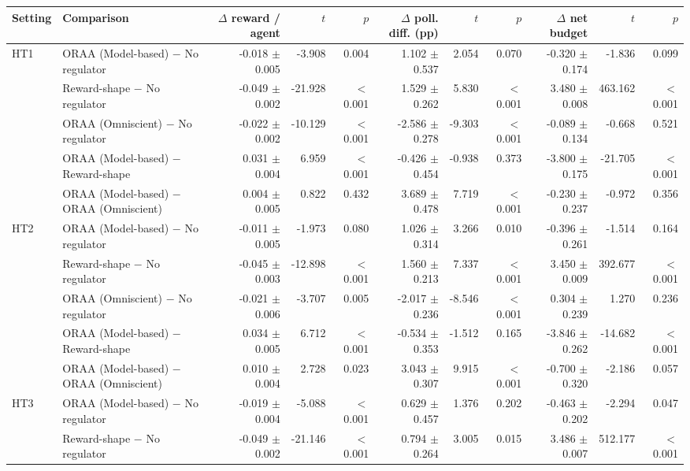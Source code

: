 \begin{tabular}{llrrrrrrrrr}
\toprule
Setting & Comparison & $\Delta$ reward / agent & $t$ & $p$ & $\Delta$ poll. diff. (pp) & $t$ & $p$ & $\Delta$ net budget & $t$ & $p$ \\
\midrule
HT1 & ORAA (Model-based) $-$ No regulator & -0.018 $\pm$ 0.005 & -3.908 & 0.004 & 1.102 $\pm$ 0.537 & 2.054 & 0.070 & -0.320 $\pm$ 0.174 & -1.836 & 0.099 \\
 & Reward-shape $-$ No regulator & -0.049 $\pm$ 0.002 & -21.928 & $<$0.001 & 1.529 $\pm$ 0.262 & 5.830 & $<$0.001 & 3.480 $\pm$ 0.008 & 463.162 & $<$0.001 \\
 & ORAA (Omniscient) $-$ No regulator & -0.022 $\pm$ 0.002 & -10.129 & $<$0.001 & -2.586 $\pm$ 0.278 & -9.303 & $<$0.001 & -0.089 $\pm$ 0.134 & -0.668 & 0.521 \\
 & ORAA (Model-based) $-$ Reward-shape & 0.031 $\pm$ 0.004 & 6.959 & $<$0.001 & -0.426 $\pm$ 0.454 & -0.938 & 0.373 & -3.800 $\pm$ 0.175 & -21.705 & $<$0.001 \\
 & ORAA (Model-based) $-$ ORAA (Omniscient) & 0.004 $\pm$ 0.005 & 0.822 & 0.432 & 3.689 $\pm$ 0.478 & 7.719 & $<$0.001 & -0.230 $\pm$ 0.237 & -0.972 & 0.356 \\
\addlinespace
HT2 & ORAA (Model-based) $-$ No regulator & -0.011 $\pm$ 0.005 & -1.973 & 0.080 & 1.026 $\pm$ 0.314 & 3.266 & 0.010 & -0.396 $\pm$ 0.261 & -1.514 & 0.164 \\
 & Reward-shape $-$ No regulator & -0.045 $\pm$ 0.003 & -12.898 & $<$0.001 & 1.560 $\pm$ 0.213 & 7.337 & $<$0.001 & 3.450 $\pm$ 0.009 & 392.677 & $<$0.001 \\
 & ORAA (Omniscient) $-$ No regulator & -0.021 $\pm$ 0.006 & -3.707 & 0.005 & -2.017 $\pm$ 0.236 & -8.546 & $<$0.001 & 0.304 $\pm$ 0.239 & 1.270 & 0.236 \\
 & ORAA (Model-based) $-$ Reward-shape & 0.034 $\pm$ 0.005 & 6.712 & $<$0.001 & -0.534 $\pm$ 0.353 & -1.512 & 0.165 & -3.846 $\pm$ 0.262 & -14.682 & $<$0.001 \\
 & ORAA (Model-based) $-$ ORAA (Omniscient) & 0.010 $\pm$ 0.004 & 2.728 & 0.023 & 3.043 $\pm$ 0.307 & 9.915 & $<$0.001 & -0.700 $\pm$ 0.320 & -2.186 & 0.057 \\
\addlinespace
HT3 & ORAA (Model-based) $-$ No regulator & -0.019 $\pm$ 0.004 & -5.088 & $<$0.001 & 0.629 $\pm$ 0.457 & 1.376 & 0.202 & -0.463 $\pm$ 0.202 & -2.294 & 0.047 \\
 & Reward-shape $-$ No regulator & -0.049 $\pm$ 0.002 & -21.146 & $<$0.001 & 0.794 $\pm$ 0.264 & 3.005 & 0.015 & 3.486 $\pm$ 0.007 & 512.177 & $<$0.001 \\

\end{tabular}
